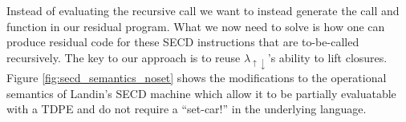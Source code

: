 \documentclass[a4paper,12pt,twoside,openright]{report}
\theoremstyle{definition}
\newcommand{\ts}{\textquotesingle}
\newcommand{\mslang}{$\lambda_{\uparrow\downarrow}$}
\begin{document}
Instead of evaluating the recursive call we want to instead generate the call and function in our residual program. What we now need to solve is how one can produce residual code for these SECD instructions that are to-be-called recursively. The key to our approach is to reuse \mslang's ability to lift closures. Figure \ref{fig:secd_semantics_noset} shows the modifications to the operational semantics of Landin's SECD machine \cite{landin1964mechanical} which allow it to be partially evaluatable with a TDPE and do not require a ``set-car!'' in the underlying language.

\begingroup
\allowdisplaybreaks
\end{document}
